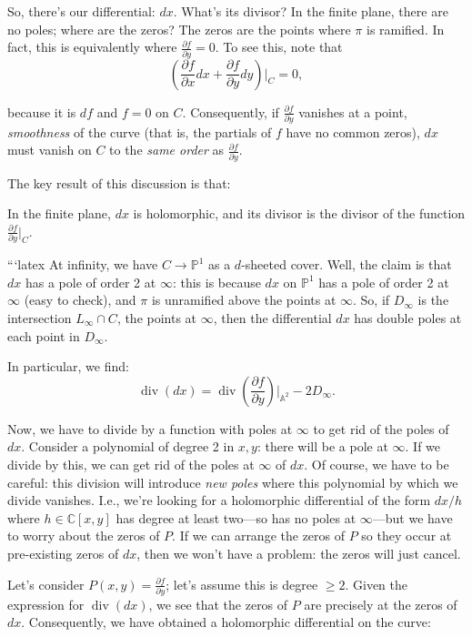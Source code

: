 \documentclass[12pt]{article}
\begin{document}
So, there's our differential: $dx$. What's its divisor? In the finite plane, there are no poles; where are the zeros? The zeros are the points where $\pi$ is ramified. In fact, this is equivalently where $\frac{\partial f}{\partial y} = 0$. To see this, note that
$$\left(\frac{\partial f}{\partial x}dx + \frac{\partial f}{\partial y}dy\right)\bigg|_C = 0,$$

because it is $df$ and $f = 0$ on $C$. Consequently, if $\frac{\partial f}{\partial y}$ vanishes at a point, \textit{smoothness} of the curve (that is, the partials of $f$ have no common zeros), $dx$ must vanish on $C$ to the \textit{same order} as $\frac{\partial f}{\partial y}$.

The key result of this discussion is that:
\begin{proposition}
    In the finite plane, $dx$ is holomorphic, and its divisor is the divisor of the function $\frac{\partial f}{\partial y}|_C$.
\end{proposition}
```latex
At infinity, we have $C \to \mathbb{P}^1$ as a $d$-sheeted cover. Well, the claim is that $dx$ has a pole of order 2 at $\infty$: this is because $dx$ on $\mathbb{P}^1$ has a pole of order 2 at $\infty$ (easy to check), and $\pi$ is unramified above the points at $\infty$. So, if $D_\infty$ is the intersection $L_\infty \cap C$, the points at $\infty$, then the differential $dx$ has double poles at each point in $D_\infty$.


In particular, we find:
$$\operatorname{div}(dx) = \operatorname{div}\left(\frac{\partial f}{\partial y}\right)\bigg|_{\mathbb{A}^2} - 2D_\infty.$$

Now, we have to divide by a function with poles at $\infty$ to get rid of the poles of $dx$. Consider a polynomial of degree 2 in $x, y$: there will be a pole at $\infty$. If we divide by this, we can get rid of the poles at $\infty$ of $dx$. Of course, we have to be careful: this division will introduce \textit{new poles} where this polynomial by which we divide vanishes. I.e., we're looking for a holomorphic differential of the form $dx/h$ where $h \in \mathbb{C}[x, y]$ has degree at least two—so has no poles at $\infty$—but we have to worry about the zeros of $P$. If we can arrange the zeros of $P$ so they occur at pre-existing zeros of $dx$, then we won't have a problem: the zeros will just cancel.

Let's consider $P(x,y) = \frac{\partial f}{\partial y}$; let's assume this is degree $\geq 2$. Given the expression for $\operatorname{div}(dx)$, we see that the zeros of $P$ are precisely at the zeros of $dx$. Consequently, we have obtained a holomorphic differential on the curve:
\end{document}
